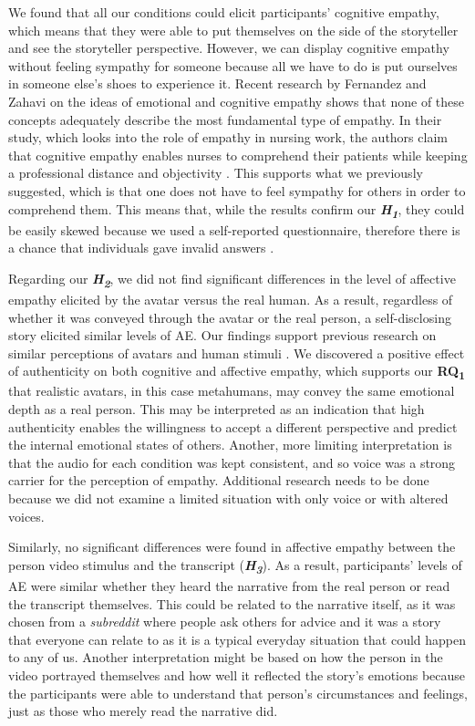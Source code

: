 We found that all our conditions could elicit participants' cognitive empathy, which means that they were able to put themselves on the side of the storyteller and see the storyteller perspective. However, we can display cognitive empathy without feeling sympathy for someone because all we have to do is put ourselves in someone else's shoes to experience it. Recent research by Fernandez and Zahavi \cite{FER20} on the ideas of emotional and cognitive empathy shows that none of these concepts adequately describe the most fundamental type of empathy. In their study, which looks into the role of empathy in nursing work, the authors claim that cognitive empathy enables nurses to comprehend their patients while keeping a professional distance and objectivity \cite{FER20}. This supports what we previously suggested, which is that one does not have to feel sympathy for others in order to comprehend them. 
This means that, while the results confirm our \textbf{\textit{H\textsubscript{1}}}, they could be easily skewed because we used a self-reported questionnaire, therefore there is a chance that individuals gave invalid answers \cite{DEM15}.

Regarding our \textbf{\textit{H\textsubscript{2}}}, we did not find significant differences in the level of affective empathy elicited by the avatar versus the real human. As a result, regardless of whether it was conveyed through the avatar or the real person, a self-disclosing story elicited similar levels of AE. Our findings support previous research on similar perceptions of avatars and human stimuli \cite{ALI15, ROT19}. We discovered a positive effect of authenticity on both cognitive and affective empathy, which supports our \textbf{RQ\textsubscript{1}} that realistic avatars, in this case metahumans, may convey the same emotional depth as a real person. This may be interpreted as an indication that high authenticity enables the willingness to accept a different perspective and predict the internal emotional states of others. Another, more limiting interpretation is that the audio for each condition was kept consistent, and so voice was a strong carrier for the perception of empathy. Additional research needs to be done because we did not examine a limited situation with only voice or with altered voices.

Similarly, no significant differences were found in affective empathy between the person video stimulus and the transcript (\textbf{\textit{H\textsubscript{3}}}). As a result, participants' levels of AE were similar whether they heard the narrative from the real person or read the transcript themselves. This could be related to the narrative itself, as it was chosen from a \textit{subreddit} where people ask others for advice and it was a story that everyone can relate to as it is a typical everyday situation that could happen to any of us. Another interpretation might be based on how the person in the video portrayed themselves and how well it reflected the story's emotions because the participants were able to understand that person's circumstances and feelings, just as those who merely read the narrative did.

